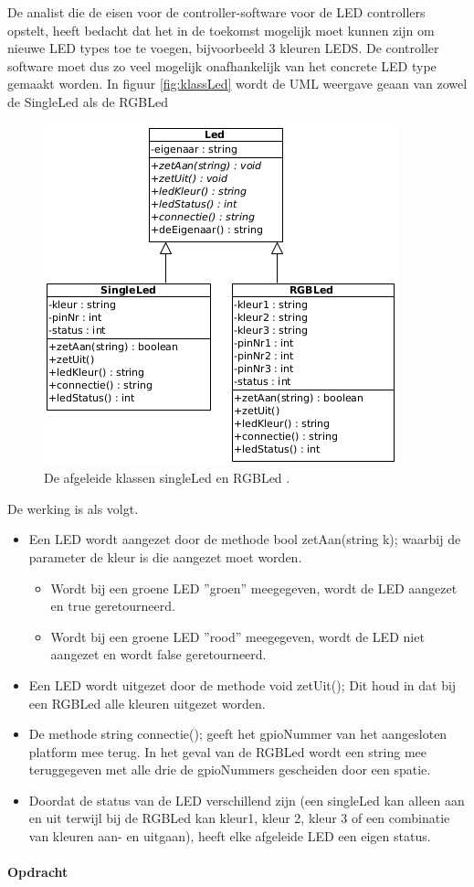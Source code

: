 De analist die de eisen voor de controller-software voor de LED controllers opstelt, heeft bedacht dat het in de toekomst mogelijk moet kunnen zijn om nieuwe LED types toe te voegen, bijvoorbeeld 3 kleuren LEDS. De controller software moet dus zo veel mogelijk onafhankelijk van het concrete LED type gemaakt worden. In figuur \ref{fig:klassLed} wordt de UML weergave geaan van zowel de SingleLed als de RGBLed
\begin{figure}[h!]
	\captionsetup{justification=centering}
	\includegraphics[width=0.6 \linewidth]{figuren/rgbKlasse}
	\centering
	\caption{De afgeleide klassen singleLed en RGBLed .}
	\label{fig:klasAfg}
\end{figure}
\newpage
De werking is als volgt.

\begin{itemize}
	\item Een LED wordt aangezet door de methode bool zetAan(string k); waarbij de parameter de kleur is die aangezet moet worden.
	\begin{itemize}
		\item Wordt bij een groene LED ''groen''  meegegeven, wordt de LED aangezet en true geretourneerd.
		\item Wordt bij een groene LED ''rood'' meegegeven, wordt de LED niet aangezet en wordt false geretourneerd.
	\end{itemize}
\item Een LED wordt uitgezet door de methode void zetUit(); Dit houd in dat bij een RGBLed alle kleuren uitgezet worden.
\item De methode string connectie(); geeft het gpioNummer van het aangesloten platform mee terug. In het geval van de RGBLed wordt een string mee teruggegeven met alle drie de gpioNummers gescheiden door een spatie.
\item Doordat de status van de LED verschillend zijn (een singleLed kan alleen aan en uit terwijl bij de RGBLed kan kleur1, kleur 2, kleur 3 of een combinatie van kleuren aan- en uitgaan), heeft elke afgeleide LED een eigen status.
	
\end{itemize}

\paragraph{Opdracht} 


